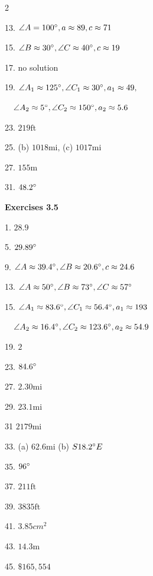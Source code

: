 \begin {multicols}{2}
  

13. $\angle A =100 \mbox{{\ensuremath{{}^\circ}}} ,a \approx 89 ,c \approx 71$ 

15. $\angle B \approx 30 \mbox{{\ensuremath{{}^\circ}}} ,\angle C \approx 40 \mbox{{\ensuremath{{}^\circ}}} ,c \approx 19$ 

17. no solution 

19. $\angle A_{1} \approx 125 \mbox{{\ensuremath{{}^\circ}}} ,\angle C_{1} \approx 30 \mbox{{\ensuremath{{}^\circ}}} ,a_{1} \approx 49\text{,}$ 

\  \ $\angle A_{2} \approx 5 \mbox{{\ensuremath{{}^\circ}}} ,\angle C_{2} \approx 150 \mbox{{\ensuremath{{}^\circ}}} ,a_{2} \approx 5.6$ 

23. $219 \mbox{ft}$ 

25. (b) $1018 \mbox{mi}\text{,}$ (c) $1017 \mbox{mi}$ 

27. $155 \mbox{m}$ 

31. $48.2 \mbox{{\ensuremath{{}^\circ}}}$ 

\textbf{Exercises 3.5} 

1. $28.9$ 

5. $29.89 \mbox{{\ensuremath{{}^\circ}}}$ 

9. $\angle A \approx 39.4 \mbox{{\ensuremath{{}^\circ}}} ,\angle B \approx 20.6 \mbox{{\ensuremath{{}^\circ}}} ,c \approx 24.6$ 

13. $\angle A \approx 50 \mbox{{\ensuremath{{}^\circ}}} ,\angle B \approx 73 \mbox{{\ensuremath{{}^\circ}}} ,\angle C \approx 57 \mbox{{\ensuremath{{}^\circ}}}$ 

15. $\angle A_{1} \approx 83.6 \mbox{{\ensuremath{{}^\circ}}} ,\angle C_{1} \approx 56.4 \mbox{{\ensuremath{{}^\circ}}} ,a_{1} \approx 193$ 

\  \ $\angle A_{2} \approx 16.4 \mbox{{\ensuremath{{}^\circ}}} ,\angle C_{2} \approx 123.6 \mbox{{\ensuremath{{}^\circ}}} ,a_{2} \approx 54.9$ 

19. $2$ 

23. $84.6 \mbox{{\ensuremath{{}^\circ}}}$ 

27. $2.30 \mbox{mi}$ 

29. $23.1 \mbox{mi}$ 

31 $2179 \mbox{mi}$ 

33. (a) $62.6 \mbox{mi}$ (b) $S 18.2 \mbox{{\ensuremath{{}^\circ}}} E$ 

35. $96 \mbox{{\ensuremath{{}^\circ}}}$ 

37. $211 \mbox{ft}$ 

39. $3835 \mbox{ft}$ 

41. $3.85 cm^{2}$ 

43. $14.3 \mbox{m}$ 

45. $ \$165,554$ 

\end {multicols}

